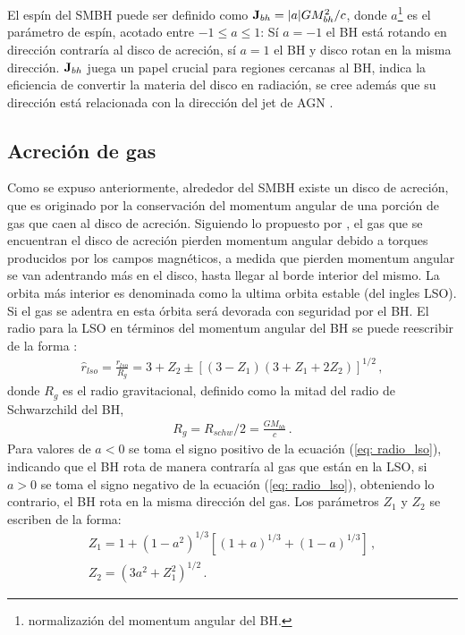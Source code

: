 El espín del SMBH puede ser definido como ${\bf{J}}_{bh}=|a|GM^{2}_{bh}/c$, donde $a$\footnote{normalizazión del momentum angular del BH.} es el parámetro de espín, acotado entre $-1\leq a \leq 1$: Sí $a=-1$ el BH está rotando en dirección contraría al disco de acreción, sí $a=1$ el BH y disco rotan en la misma dirección. ${\bf{J}}_{bh}$ juega un papel crucial para regiones cercanas al BH, indica la eficiencia de convertir la materia del disco en radiación, se cree además que su dirección está relacionada con la dirección del jet de AGN \cite{fanidakis2011}. 

\subsection{Acreción de gas}
\label{subsec: Acrecion_gas}
Como se expuso anteriormente, alrededor del SMBH existe un disco de acreción, que es originado por la conservación del momentum angular de una porción de gas  que caen al disco de acreción. Siguiendo lo propuesto por \cite{lynden1969}, el gas que se encuentran el disco de acreción pierden momentum angular debido a torques producidos por los campos magnéticos, a medida que pierden momentum angular se van adentrando más en el disco, hasta llegar al borde interior del mismo. La orbita más interior es denominada como la ultima orbita estable (del ingles LSO). Si el gas se adentra en esta órbita será devorada con seguridad por el BH. El radio para la LSO en términos del momentum angular del BH se puede reescribir de la forma \cite{bardeen1972}:
%
\begin{align}
 \hat{r}_{lso}=\frac{r_{lso}}{R_g}=3+Z_{2}\pm \left[ (3-Z_{1})(3+Z_{1}+2Z_{2})\right]^{1/2} \,,
 \label{eq: radio_lso}
\end{align}
%
donde $R_{g}$ es el radio gravitacional, definido como la mitad del radio de Schwarzchild del BH, 
%
\begin{align}
    R_{g}= R_{schw}/2  = \frac{GM_{bh}}{c}\,.
\end{align}
%
Para valores de $a<0$ se toma el signo positivo de la ecuación (\ref{eq: radio_lso}), indicando que el BH rota de manera contraría al gas que están en la LSO, si $a>0$ se toma el signo negativo de la ecuación (\ref{eq: radio_lso}), obteniendo lo contrario, el BH rota en la misma dirección del gas. Los parámetros $Z_1$ y $Z_2$ se escriben de la forma:
%
\begin{eqnarray}
    Z_1 = 1+(1-a^{2})^{1/3}\left[(1+a)^{1/3}+(1-a)^{1/3} \right]\,,\\
    Z_2 = (3a^{2}+Z_{1}^{2})^{1/2}\,.
\end{eqnarray}
